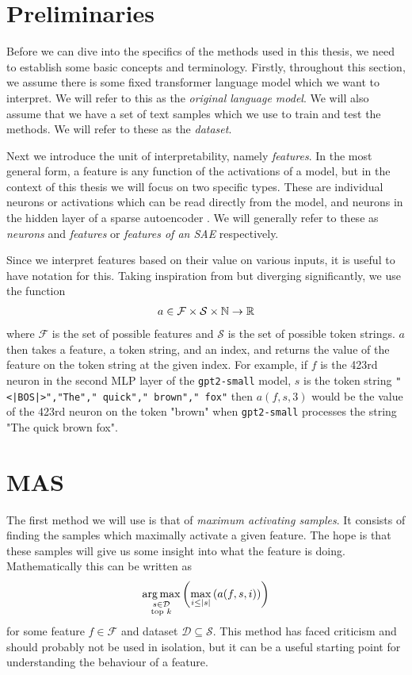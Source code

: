\documentclass[../main.tex]{subfiles}
\begin{document}
\section{Preliminaries}
Before we can dive into the specifics of the methods used in this thesis, 
we need to establish some basic concepts and terminology.
Firstly, throughout this section, we assume there is some fixed 
transformer language model \citep{vaswani_attention_2023} 
which we want to interpret.
We will refer to this as the \emph{original language model}.
We will also assume that we have a set of text samples 
which we use to train and test the methods.
We will refer to these as the \emph{dataset}.

Next we introduce the unit of interpretability, namely \emph{features}. 
In the most general form, a feature is any function of the activations 
of a model, but in the context of this thesis we will focus on two 
specific types.
These are individual neurons or activations which can be read directly 
from the model, and neurons in the hidden layer of 
a sparse autoencoder \citep{conmy_towards_2023}.
We will generally refer to these as \emph{neurons} and 
\emph{features} or \emph{features of an SAE} respectively.

Since we interpret features based on their value on various inputs, 
it is useful to have notation for this.
Taking inspiration from \citet{foote_neuron_2023} 
but diverging significantly, we use the function
\begin{align*}
    a\in\mathcal{F}\times\mathcal{S}\times\mathbb{N}\to\mathbb{R}
\end{align*} 
where $\mathcal{F}$ is the set of possible features and
$\mathcal{S}$ is the set of possible token strings.
$a$ then takes a feature, a token string, and an index, and returns 
the value of the feature on the token string at the given index.
For example, if $f$ is the 423rd neuron in the second MLP layer of 
the \verb|gpt2-small| model, $s$ is the token string 
\verb="<|BOS|>","The"," quick"," brown"," fox"=
then $a(f,s,3)$ would be the value of the 423rd neuron on the token 
"brown" when \verb|gpt2-small| processes the string "The quick brown fox".

\section{MAS}
The first method we will use is that of \emph{maximum activating samples}.
It consists of finding the samples which maximally activate a given feature.
The hope is that these samples will give us some insight 
into what the feature is doing.
Mathematically this can be written as
\begin{align*}
    \operatorname*{arg\,max}_{\substack{s\in\mathcal{D}\\ \text{top }k}}\left(\max_{i\leq|s|}\left(a(f,s,i)\right)\right)
\end{align*}
for some feature $f\in\mathcal{F}$ and dataset $\mathcal{D}\subseteq\mathcal{S}$.
This method has faced criticism \citep{bolukbasi_interpretability_2021} 
and should probably not be used in isolation, but it can be a useful
starting point for understanding the behaviour of a feature.
\end{document}
